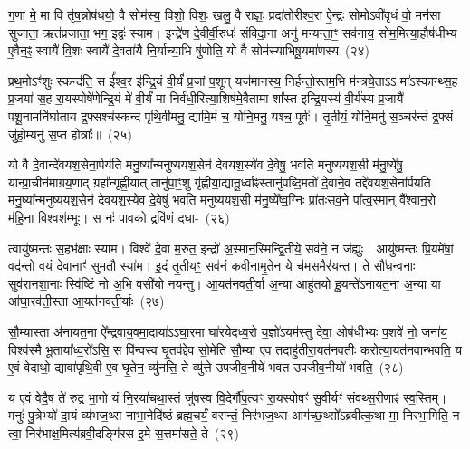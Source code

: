 ग॒णा मे॒ मा वि तृ॑ष॒न्नोष॑धयो॒ वै सोम॑स्य॒ विशो॒ विशः॒ खलु॒ वै राज्ञः॒ प्रदा॑तोरीश्व॒रा ऐ॒न्द्रः सोमो\-ऽवी॑वृधं वो॒ मन॑सा सुजाता॒ ऋत॑प्रजाता॒ भग॒ इद्वः॑ स्याम। इन्द्रे॑ण दे॒वीर्वी॒रुधः॑ संविदा॒ना अनु॑ मन्यन्ता॒ꣳ॒ सव॑नाय॒ सोम॒मित्या॒हौष॑धीभ्य ए॒वैन॒ꣴ॒ स्वायै॑ वि॒शः स्वायै॑ दे॒वता॑यै नि॒र्याच्या॒भि षु॑णोति॒ यो वै सोम॑स्याभिषू॒यमा॑णस्य~(२४)\ip

प्रथ॒मो\-ऽꣳ॑शुः स्कन्द॑ति॒ स ई᳚श्व॒र इ॑न्द्रि॒यं वी॒र्यं॑ प्र॒जां प॒शून् यज॑मानस्य॒ निर्\mbox{}ह॑न्तो॒स्तम॒भि म॑न्त्रये॒ता\-ऽऽ मा᳚\-ऽ\-स्कान्थ्स॒ह प्र॒जया॑ स॒ह रा॒यस्पोषे॑णेन्द्रि॒यं मे॑ वी॒र्यं॑ मा निर्व॑धी॒रित्या॒शिष॑मे॒वैतामा शा᳚स्त इन्द्रि॒यस्य॑ वी॒र्य॑स्य प्र॒जायै॑ पशू॒नामनि॑र्घाताय द्र॒फ्सश्च॑स्कन्द पृथि॒वीमनु॒ द्यामि॒मं च॒ योनि॒मनु॒ यश्च॒ पूर्वः॑। तृ॒तीयं॒ योनि॒मनु॑ स॒ञ्चर॑न्तं द्र॒फ्सं जु॑हो॒म्यनु॑ स॒प्त होत्राः᳚॥~(२५)\ip

{\anuvakamend[{त॒र्पय॑त मा\-ऽभिषू॒यमा॑णस्य॒ यश्च॒ दश॑ च}]}

यो वै दे॒वान्दे॑वयश॒सेना॒र्पय॑ति मनु॒ष्या᳚न्मनुष्ययश॒सेन॑ देव\-यश॒स्ये॑व दे॒वेषु॒ भव॑ति मनुष्ययश॒सी म॑नु॒ष्ये॑षु॒ यान्प्रा॒चीन॑\-माग्रय॒णाद् ग्रहा᳚न्गृह्णी॒यात् तानु॑पा॒ꣳ॒शु गृ॑ह्णीया॒द्यानू॒र्ध्वाꣴस्तानु॑पब्दि॒मतो॑ दे॒वाने॒व तद्दे॑वयश॒सेना᳚र्पयति मनु॒ष्या᳚न्मनुष्ययश॒सेन॑ देवयश॒स्ये॑व दे॒वेषु॑ भवति मनुष्ययश॒सी म॑नु॒ष्ये᳚ष्व॒ग्निः प्रा॑तःसव॒ने पा᳚त्व॒स्मान् वै᳚श्वान॒रो म॑हि॒ना वि॒श्वश॑म्भूः। स नः॑ पाव॒को द्रवि॑णं दधा॒-~(२६)\ip

त्वायु॑ष्मन्तः स॒हभ॑क्षाः स्याम। विश्वे॑ दे॒वा म॒रुत॒ इन्द्रो॑ अ॒स्मान॒स्मिन्द्वि॒तीये॒ सव॑ने॒ न ज॑ह्युः। आयु॑ष्मन्तः प्रि॒यमे॑षां॒ वद॑न्तो व॒यं दे॒वानाꣳ॑ सुम॒तौ स्या॑म। इ॒दं तृ॒तीय॒ꣳ॒ सव॑नं कवी॒नामृ॒तेन॒ ये च॑म॒समैर॑यन्त। ते सौ॑धन्व॒नाः सुव॑रानशा॒नाः स्वि॑ष्टिं नो अ॒भि वसी॑यो नयन्तु। आ॒यत॑नवती॒र्वा अ॒न्या आहु॑तयो हू॒यन्ते॑\-ऽनायत॒ना अ॒न्या या आ॑घा॒रव॑ती॒स्ता आ॒यत॑नवती॒र्याः~(२७)\ip

सौ॒म्यास्ता अ॑नायत॒ना ऐ᳚न्द्रवाय॒वमा॒दाया॑\-ऽऽ\-घा॒रमा घा॑रयेदध्व॒रो य॒ज्ञो॑\-ऽयम॑स्तु देवा॒ ओष॑धीभ्यः प॒शवे॑ नो॒ जना॑य॒ विश्व॑स्मै भू॒ताया᳚ध्व॒रो॑\-ऽसि॒ स पि॑न्वस्व घृ॒तव॑द्देव सो॒मेति॑ सौ॒म्या ए॒व तदाहु॑तीरा॒यत॑नवतीः करोत्या॒यत॑नवान्भवति॒ य ए॒वं वेदाथो॒ द्यावा॑\-पृथि॒वी ए॒व घृ॒तेन॒ व्यु॑नत्ति॒ ते व्यु॑त्ते उपजीव॒नीये॑ भवत उपजीव॒नीयो॑ भवति॒~(२८)\ip

य ए॒वं वेदै॒ष ते॑ रुद्र भा॒गो यं नि॒रया॑चथा॒स्तं जु॑षस्व वि॒देर्गौ॑प॒त्यꣳ रा॒यस्पोषꣳ॑ सु॒वीर्यꣳ॑ संवथ्स॒रीणाꣴ॑ स्व॒स्तिम्। मनुः॑ पु॒त्रेभ्यो॑ दा॒यं व्य॑भज॒थ्स नाभा॒नेदि॑ष्ठं ब्रह्म॒चर्यं॒ वस॑न्तं॒ निर॑भज॒थ्स आग॑च्छ॒थ्सो᳚\-ऽब्रवीत्क॒था मा॒ निर॑भा॒गिति॒ न त्वा॒ निर॑भाक्ष॒मित्य॑ब्रवी॒दङ्गि॑रस इ॒मे स॒त्तमा॑सते॒ ते~(२९)\ip

